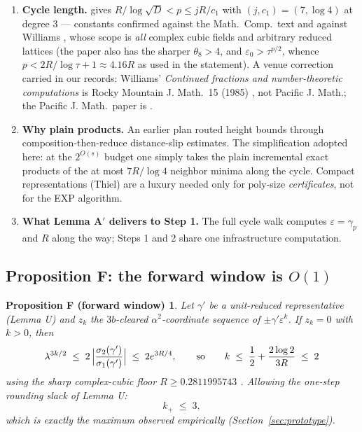 \documentclass[11pt]{amsart}
\theoremstyle{plain}
\newtheorem*{propositionF}{Proposition F (forward window)}
\theoremstyle{remark}
\begin{document}
\begin{enumerate}
\item \textbf{Cycle length.} \cite[Cor.~2.8]{BW88} gives
  $R/\log\sqrt{D} < p \le jR/c_1$ with $(j, c_1) = (7, \log 4)$ at
  degree 3 --- constants confirmed against the Math.\ Comp.\ text and
  against Williams \cite{Wil86}, whose scope is \emph{all} complex
  cubic fields and arbitrary reduced lattices (the paper also has the
  sharper $\theta_8 > 4$, and $\varepsilon_0 > \tau^{p/2}$, whence
  $p < 2R/\log\tau + 1 \approx 4.16R$ as used in the statement). A
  venue correction carried in our records: Williams' \emph{Continued
  fractions and number-theoretic computations} is Rocky Mountain J.
  Math.\ 15 (1985) \cite{Wil85}, not Pacific J. Math.; the Pacific J.
  Math.\ paper is \cite{Wil86}.
\item \textbf{Why plain products.} An earlier plan routed height
  bounds through composition-then-reduce distance-slip estimates. The
  simplification adopted here: at the $2^{O(s)}$ budget
  one simply takes the plain incremental exact products of the at
  most $7R/\log 4$ neighbor minima along the cycle. Compact
  representations (Thiel) are a luxury needed only for
  $\mathrm{poly}$-size \emph{certificates}, not for the EXP
  algorithm.
\item \textbf{What Lemma A$'$ delivers to Step 1.} The full cycle
  walk computes $\varepsilon = \gamma_p$ and $R$ along the way; Steps
  1 and 2 share one infrastructure computation.
\end{enumerate}

\subsection{Proposition F: the forward window is $O(1)$}
\label{sec:propF}

\begin{propositionF}
Let $\gamma'$ be a unit-reduced representative (Lemma U) and $z_k$
the $3b$-cleared $\alpha^2$-coordinate sequence of
$\pm\gamma'\varepsilon^k$. If $z_k = 0$ with $k > 0$, then
\[
\lambda^{3k/2} \;\le\;
2\,\Bigl|\frac{\sigma_2(\gamma')}{\sigma_1(\gamma')}\Bigr|
\;\le\; 2e^{3R/4},
\qquad\text{so}\qquad
k \;\le\; \frac12 + \frac{2\log 2}{3R} \;\le\; 2
\]
using the sharp complex-cubic floor $R \ge 0.2811995743$
\cite{ADF16}. Allowing the one-step rounding slack of Lemma U:
\[
k_+ \;\le\; 3,
\]
which is exactly the maximum observed empirically
(Section~\ref{sec:prototype}).
\end{propositionF}
\end{document}
